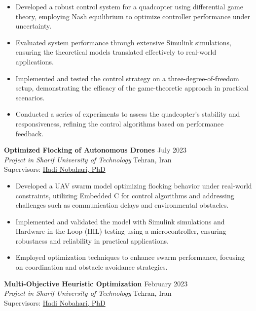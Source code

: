 \documentclass[12pt]{article}
\begin{document}
\begin{itemize} \itemsep -4pt %
    \item Developed a robust control system for a quadcopter using differential game theory, employing Nash equilibrium to optimize controller performance under uncertainty.
    \item Evaluated system performance through extensive Simulink simulations, ensuring the theoretical models translated effectively to real-world applications.
    \item Implemented and tested the control strategy on a three-degree-of-freedom setup, demonstrating the efficacy of the game-theoretic approach in practical scenarios.
    \item Conducted a series of experiments to assess the quadcopter's stability and responsiveness, refining the control algorithms based on performance feedback.
\end{itemize}


\vspace{0.2in}

\noindent
{\bfseries Optimized Flocking of Autonomous Drones
\href{https://github.com/alibaniasad1999/Guidance-and-navigation}{\faGithub}
} \hfill July 2023 \\ 
\noindent \textit{Project in Sharif University of Technology} \hfill Tehran, Iran \\ 
\noindent Supervisors: 
\href{https://ae.sharif.edu/~portal/faculty/1091235256}{Hadi Nobahari, PhD} 

\begin{itemize} \itemsep -1pt %
    \item Developed a UAV swarm model optimizing flocking behavior under real-world constraints, utilizing Embedded C for control algorithms and addressing challenges such as communication delays and environmental obstacles.
    \item Implemented and validated the model with Simulink simulations and Hardware-in-the-Loop (HIL) testing using a microcontroller, ensuring robustness and reliability in practical applications.
    \item Employed optimization techniques to enhance swarm performance, focusing on coordination and obstacle avoidance strategies.
\end{itemize}


\vspace{0.2in}
\noindent
{\bfseries Multi-Objective Heuristic Optimization
\href{https://github.com/alibaniasad1999/Heuristic-optimization-algorithms}{\faGithub}
}
\hfill February 2023 \\ 
\noindent \textit{Project in Sharif University of Technology} \hfill Tehran, Iran \\
\noindent Supervisors: 
\href{https://ae.sharif.edu/~portal/faculty/1091235256}{Hadi Nobahari, PhD} 
\end{document}
